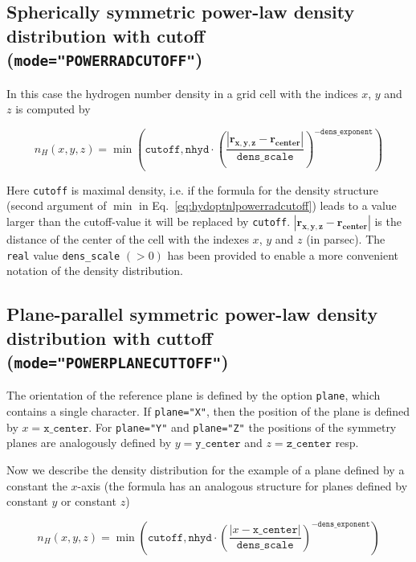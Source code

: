 \documentclass[a4paper,10pt]{article}
\begin{document}
\begin{appendix}
\subsection{Spherically symmetric power-law density distribution with cutoff\\ 
(\texttt{mode="POWERRADCUTOFF"})}
In this case the hydrogen number density in a grid cell with the indices $x$, 
$y$ and $z$ is computed by

\begin{equation}
 n_H(x,y,z) = \min \left(\mathtt{cutoff}, 
\mathtt{nhyd} \cdot \left(
 \frac{\left|\mathbf{r_{x,y,z}} - 
\mathbf{r_{center}} \right|}{\mathtt{dens\_scale}}
\right)^{- \mathtt{dens\_exponent}}\right)
\label{eq:hydoptnlpowerradcutoff}
\end{equation}

Here \texttt{cutoff} is maximal density, i.e. if the formula for the density
structure (second argument of $\min$ in Eq.~\ref{eq:hydoptnlpowerradcutoff}) 
leads to a  value larger than the cutoff-value it will be replaced by 
\texttt{cutoff}.  
$\left|\mathbf{r_{x,y,z}} - \mathbf{r_{center}} \right|$ is the
distance of the center of the cell with the indexes $x$, $y$ and $z$ (in 
parsec). The \texttt{real} value \texttt{dens\_scale} $(>0)$ has been provided 
to enable a more convenient notation of the density distribution.


\subsection{Plane-parallel symmetric power-law density distribution with 
cuttoff\\ (\texttt{mode="POWERPLANECUTTOFF"})}

The orientation of the reference plane is defined by the option \texttt{plane}, 
which contains a single character. If \texttt{plane="X"}, then the 
position of the plane is defined by $x=\mathtt{x\_center}$. For 
\texttt{plane="Y"} and 
\texttt{plane="Z"} the positions of the symmetry planes are analogously 
defined by  $y=\mathtt{y\_center}$  and  $z=\mathtt{z\_center}$ resp.

Now we describe the density distribution for the example of a plane defined by 
a constant the $x$-axis (the formula has an analogous structure for planes 
defined by constant $y$ or constant $z$)

\begin{equation}
 n_H(x,y,z) = \min \left(\mathtt{cutoff}, 
 \mathtt{nhyd} \cdot \left(
 \frac{\left|x - 
 \texttt{x\_center} \right|}{\mathtt{dens\_scale}}
\right)^{- \mathtt{dens\_exponent}}\right)
\label{eq:hydoptnlpowerplanecutoff}
\end{equation}




\end{appendix}
\end{document}
